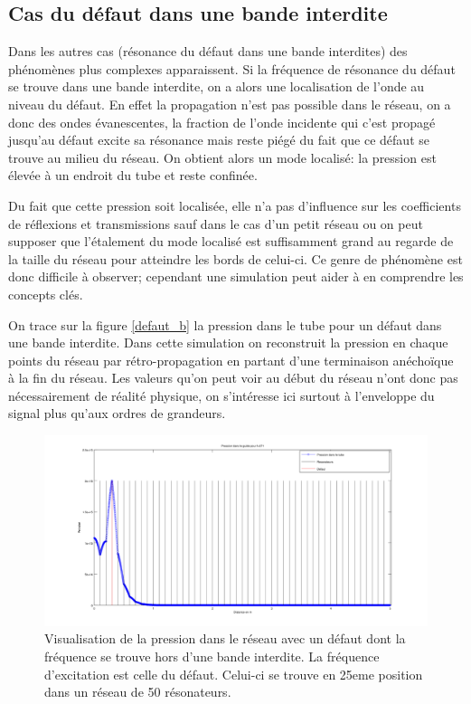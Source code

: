 \subsection{Cas du défaut dans une bande interdite}

Dans les autres cas (résonance du défaut dans une bande interdites) des phénomènes plus complexes apparaissent.
Si la fréquence de résonance du défaut se trouve dans une bande interdite, on a alors une localisation de l'onde au niveau du défaut. En effet la propagation n'est pas possible dans le réseau, on a donc des ondes évanescentes, la fraction de l'onde incidente qui c'est propagé jusqu'au défaut excite sa résonance mais reste piégé du fait que ce défaut se trouve au milieu du réseau. On obtient alors un mode localisé: la pression est élevée à un endroit du tube et reste confinée.
\bigskip


Du fait que cette pression soit localisée, elle n'a pas d'influence sur les coefficients de réflexions et transmissions sauf dans le cas d'un petit réseau ou on peut supposer que l'étalement du mode localisé est suffisamment grand au regarde de la taille du réseau pour atteindre les bords de celui-ci. Ce genre de phénomène est donc difficile à observer; cependant une simulation peut aider à en comprendre les concepts clés.
\bigskip

On trace sur la figure \ref{defaut_b} la pression dans le tube pour un défaut dans une bande interdite. Dans cette simulation on reconstruit la pression en chaque points du réseau par rétro-propagation en partant d'une terminaison anéchoïque à la fin du réseau. Les valeurs qu'on peut voir au début du réseau n'ont donc pas nécessairement de réalité physique, on s'intéresse ici surtout à l'enveloppe du signal plus qu'aux ordres de grandeurs.


\begin{figure}[!h]
\centering
\includegraphics[scale=0.25]{images_chp2/visu_pression_favo2.png}
\caption{\label{defaut_hb} Visualisation de la pression dans le réseau avec un défaut dont la fréquence se trouve hors d'une bande interdite. La fréquence d'excitation est celle du défaut. Celui-ci se trouve en 25eme position dans un réseau de 50 résonateurs.}
\end{figure}

